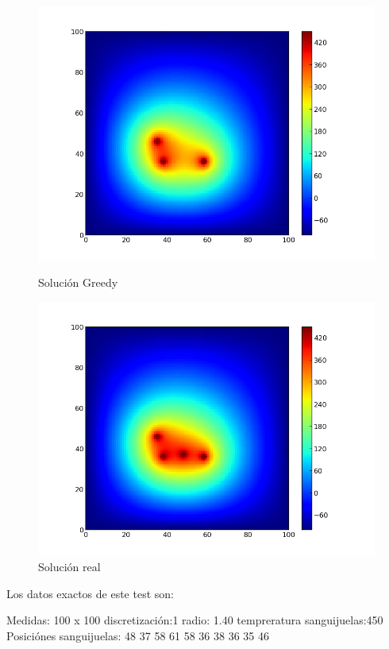 \begin{figure}[htb]
\begin{center}
\includegraphics[scale=0.40]{imagenes/test6_greedy.png} 
\caption{Solución Greedy} 

        \end{center}
\endminipage\hfill
{}
\begin{center}
\includegraphics[scale=0.40]{imagenes/test6_solucion_real.png} 
\caption{Solución real} 
        \end{center}
\endminipage\hfill 


\end{figure}
Los datos exactos de este test son:

Medidas: 100 x 100 
discretización:1 
radio: 1.40 
tempreratura sanguijuelas:450 
Posiciónes sanguijuelas:
48 37
58 61
58 36
38 36
35 46



